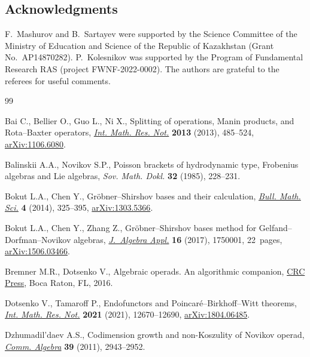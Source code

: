 \documentclass[pdftex]{sigma}
\numberwithin{equation}{section}
\begin{document}
\subsection*{Acknowledgments}
F.~Mashurov and B.~Sartayev were supported by the Science Committee of the Ministry of Education and Science of the Republic of Kazakhstan (Grant No.~AP14870282). P.~Kolesnikov was supported by the Program of Fundamental Research RAS (project FWNF-2022-0002).
The authors are grateful to the referees for useful comments.

\begin{thebibliography}{99}
\footnotesize\itemsep=0pt

Bai C., Bellier O., Guo L., Ni X., Splitting of operations, {M}anin products,
 and {R}ota--{B}axter operators, \href{https://doi.org/10.1093/imrn/rnr266}{\textit{Int. Math. Res. Not.}} \textbf{2013}
 (2013), 485--524, \href{https://arxiv.org/abs/1106.6080}{arXiv:1106.6080}.

Balinskii A.A., Novikov S.P., Poisson brackets of hydrodynamic type,
 {F}robenius algebras and {L}ie algebras, \textit{Sov. Math. Dokl.}
 \textbf{32} (1985), 228--231.

Bokut L.A., Chen Y., Gr\"obner--{S}hirshov bases and their calculation,
 \href{https://doi.org/10.1007/s13373-014-0054-6}{\textit{Bull. Math. Sci.}} \textbf{4} (2014), 325--395, \href{https://arxiv.org/abs/1303.5366}{arXiv:1303.5366}.

Bokut L.A., Chen Y., Zhang Z., Gr\"obner--{S}hirshov bases method for
 {G}elfand--{D}orfman--{N}ovikov algebras, \href{https://doi.org/10.1142/S0219498817500013}{\textit{J.~Algebra Appl.}}
 \textbf{16} (2017), 1750001, 22~pages, \href{https://arxiv.org/abs/1506.03466}{arXiv:1506.03466}.

Bremner M.R., Dotsenko V., Algebraic operads. {A}n algorithmic companion, \href{https://doi.org/10.1201/b20061}{CRC
 Press}, Boca Raton, FL, 2016.

Dotsenko V., Tamaroff P., Endofunctors and {P}oincar\'e--{B}irkhoff--{W}itt
 theorems, \href{https://doi.org/10.1093/imrn/rnz369}{\textit{Int. Math. Res. Not.}} \textbf{2021} (2021), 12670--12690,
 \href{https://arxiv.org/abs/1804.06485}{arXiv:1804.06485}.

Dzhumadil'daev A.S., Codimension growth and non-{K}oszulity of {N}ovikov
 operad, \href{https://doi.org/10.1080/00927870903386494}{\textit{Comm. Algebra}} \textbf{39} (2011), 2943--2952.


\end{thebibliography}
\end{document}
